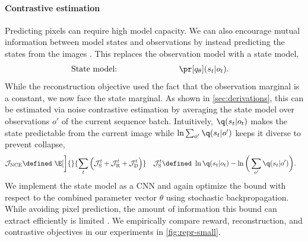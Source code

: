 \paragraph{Contrastive estimation}

Predicting pixels can require high model capacity. We can also encourage mutual information between model states and observations by instead predicting the states from the images \citep{guo2018actioncpc}. This replaces the observation model with a state model,
\begin{gather}
\begin{aligned}
\makebox[12em][l]{State model:} && &\pr[q_\theta](s_t|o_t).
\label{eq:contrastive_model}
\end{aligned}
\end{gather}%
While the reconstruction objective used the fact that the observation marginal is a constant, we now face the state marginal. As shown in \cref{sec:derivations}, this can be estimated via noise contrastive estimation \citep[NCE;][]{gutmann2010nce,oord2018cpc} by averaging the state model over observations $o'$ of the current sequence batch. Intuitively, $\q(s_t|o_t)$ makes the state predictable from the current image while $\ln\sum_{o'}\q(s_t|o')$ keeps it diverse to prevent collapse,
\begin{gather}
\begin{aligned}
\mathcal{J}_{\mathrm{NCE}}
\defined\ \E[\bigg]{}{\sum_t\Big(\mathcal{J}_{\mathrm{S}}^t+\mathcal{J}_{\mathrm{R}}^t+\mathcal{J}_{\mathrm{D}}^t\Big)}\quad
\mathcal{J}_{\mathrm{S}}^t
\defined\ &\ln\q(s_t|o_t)
-\ln\bigg(\sum_{o'}\q(s_t|o')\bigg).
\label{eq:contrastive_objective}
\end{aligned}\raisetag{1.52\baselineskip}
\end{gather}%
We implement the state model as a CNN and again optimize the bound with respect to the combined parameter vector $\theta$ using stochastic backpropagation. While avoiding pixel prediction, the amount of information this bound can extract efficiently is limited \citep{mcallester2018ncelimit}. We empirically compare reward, reconstruction, and contrastive objectives in our experiments in \cref{fig:repr-small}.